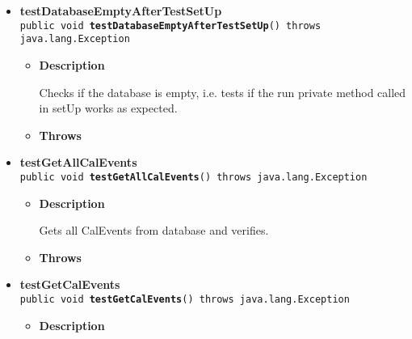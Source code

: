 \documentclass[11pt,a4paper]{report}
\begin{document}
{{{\begin{itemize}
{\begin{itemize}
{Tries to empty the event table in the database
}
\item{{\bf  Throws}
}%
\end{itemize}
}%
\item{ 
{\bf  testDatabaseEmptyAfterTestSetUp}\\
\texttt{public void\ {\bf  testDatabaseEmptyAfterTestSetUp}() throws java.lang.Exception
\label{is.mpg.ruglan.test.DabbiTest.testDatabaseEmptyAfterTestSetUp()}}%
\begin{itemize}
\item{
{\bf  Description}

Checks if the database is empty, i.e. tests if the run private method called in setUp works as expected.
}
\item{{\bf  Throws}
}%
\end{itemize}
}%
\item{ 
{\bf  testGetAllCalEvents}\\
\texttt{public void\ {\bf  testGetAllCalEvents}() throws java.lang.Exception
\label{is.mpg.ruglan.test.DabbiTest.testGetAllCalEvents()}}%
\begin{itemize}
\item{
{\bf  Description}

Gets all CalEvents from database and verifies.
}
\item{{\bf  Throws}
}%
\end{itemize}
}%
\item{ 
{\bf  testGetCalEvents}\\
\texttt{public void\ {\bf  testGetCalEvents}() throws java.lang.Exception
\label{is.mpg.ruglan.test.DabbiTest.testGetCalEvents()}}%
\begin{itemize}
\item{
{\bf  Description}

}
\end{itemize}}
\end{itemize}}}}
\end{document}
